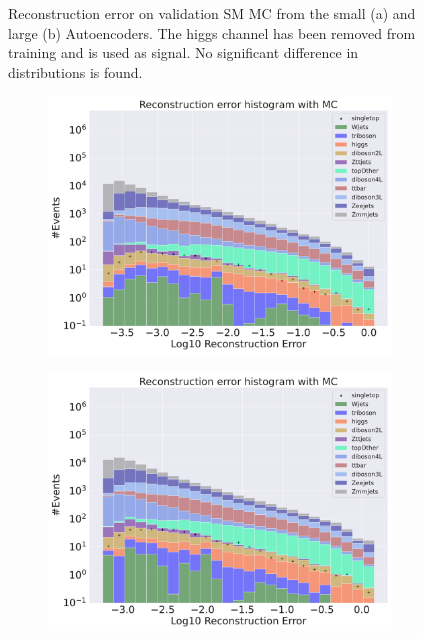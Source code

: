 \begin{figure}[H]
\begin{subfigure}{.45\textwidth}
        \caption{ }
        \label{fig:ae_big_higgs}
    \end{subfigure}
    \hfill 
    \caption[AE | Reconstruction error using Higgs channel as signal]{Reconstruction error on validation SM MC from the small (a) and large (b) Autoencoders. The higgs channel has been removed from training and 
    is used as signal. No significant difference in distributions is found.  } 
    \label{fig:ae_big_channel_1}
    
\end{figure}

\begin{figure}[H]
    \centering
    \begin{subfigure}{.45\textwidth}
        \includegraphics[width=\textwidth]{Figures/AE_testing/small/b_data_recon_big_rm3_feats_sig_singletop.pdf}
        \caption{}
        \label{fig:ae_small_singletop}
    \end{subfigure}
    \hfill
    \begin{subfigure}{.45\textwidth}
        \includegraphics[width=\textwidth]{Figures/AE_testing/big/b_data_recon_big_rm3_feats_sig_singletop.pdf}

\end{subfigure}
\end{figure}
